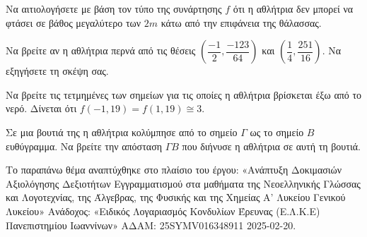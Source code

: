 \begin{alist}
\item Να αιτιολογήσετε με βάση τον τύπο της συνάρτησης $f$ ότι η αθλήτρια δεν μπορεί να φτάσει σε βάθος μεγαλύτερο των $2m$ κάτω από την επιφάνεια της θάλασσας.
\item

\begin{rlist}
\item Να βρείτε αν η αθλήτρια περνά από τις θέσεις $\left( \dfrac{- 1}{2},\dfrac{- 123}{64} \right)$ και $\left( \dfrac{1}{4},\dfrac{251}{16} \right)$. Να εξηγήσετε τη σκέψη σας.
\item Να βρείτε τις τετμημένες των σημείων για τις οποίες η αθλήτρια βρίσκεται έξω από το νερό. Δίνεται ότι $f( - 1,19) = f(1,19) \cong 3$.
\item Σε μια βουτιά της η αθλήτρια κολύμπησε από το σημείο $\Gamma$ ως το σημείο $B$ ευθύγραμμα. Να βρείτε την απόσταση $\Gamma B$ που διήνυσε η αθλήτρια σε αυτή τη βουτιά.

{\footnotesize Το παραπάνω θέμα αναπτύχθηκε στο πλαίσιο του έργου: «Ανάπτυξη Δοκιμασιών Αξιολόγησης Δεξιοτήτων Εγγραμματισμού στα μαθήματα της Νεοελληνικής Γλώσσας και Λογοτεχνίας, της Άλγεβρας, της Φυσικής και της Χημείας Α' Λυκείου Γενικού Λυκείου» Ανάδοχος: «Ειδικός Λογαριασμός Κονδυλίων Έρευνας (Ε.Λ.Κ.Ε) Πανεπιστημίου Ιωαννίνων» ΑΔΑΜ: 25SYMV016348911 2025-02-20.}
\end{rlist}
\end{alist}

